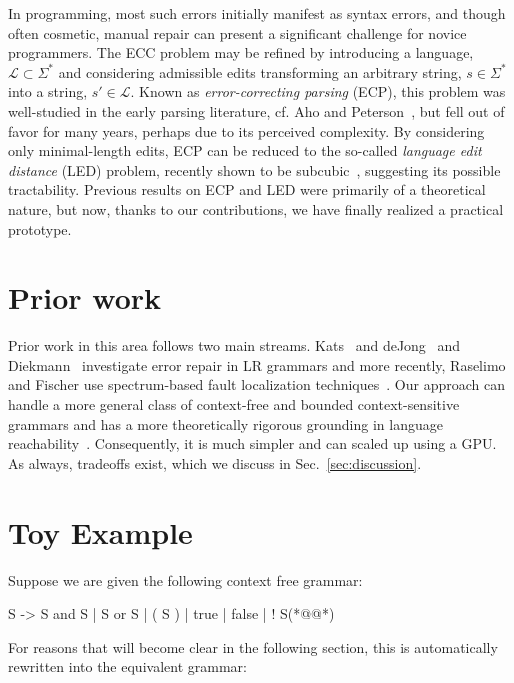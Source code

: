 \documentclass[sigplan,nonacm]{acmart}\settopmatter{printfolios=false,printccs=false,printacmref=false}
\begin{document}
In programming, most such errors initially manifest as syntax errors, and though often cosmetic, manual repair can present a significant challenge for novice programmers. The ECC problem may be refined by introducing a language, $\mathcal{L} \subset \Sigma^*$ and considering admissible edits transforming an arbitrary string, $s \in \Sigma^*$ into a string, $s'\in\mathcal{L}$. Known as \textit{error-correcting parsing} (ECP), this problem was well-studied in the early parsing literature, cf. Aho and Peterson~\cite{aho1972minimum}, but fell out of favor for many years, perhaps due to its perceived complexity. By considering only minimal-length edits, ECP can be reduced to the so-called \textit{language edit distance} (LED) problem, recently shown to be subcubic~\cite{bringmann2019truly}, suggesting its possible tractability. Previous results on ECP and LED were primarily of a theoretical nature, but now, thanks to our contributions, we have finally realized a practical prototype.

\section{Prior work}

Prior work in this area follows two main streams. Kats~\cite{kats2009providing} and deJong~\cite{de2012automated} and Diekmann~\cite{diekmann2018dont} investigate error repair in LR grammars and more recently, Raselimo and Fischer use spectrum-based fault localization techniques~\cite{raselimo2021automatic}. Our approach can handle a more general class of context-free and bounded context-sensitive grammars and has a more theoretically rigorous grounding in language reachability~\cite{melski1997interconvertbility}. Consequently, it is much simpler and can scaled up using a GPU. As always, tradeoffs exist, which we discuss in Sec.~\ref{sec:discussion}.

\section{Toy Example}

Suppose we are given the following context free grammar:

\begin{tidyinput}
S -> S and S | S or S | ( S ) | true | false | ! S(*@\caret{ }@*)
\end{tidyinput}

\noindent For reasons that will become clear in the following section, this is automatically rewritten into the equivalent grammar:
\end{document}
